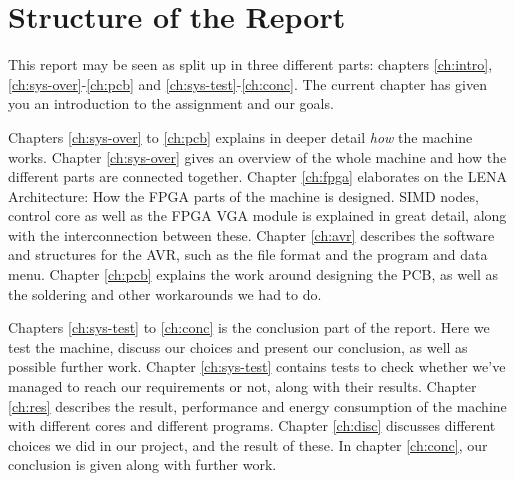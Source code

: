 \section{Structure of the Report}

This report may be seen as split up in three different parts: chapters
\ref{ch:intro}, \ref{ch:sys-over}-\ref{ch:pcb} and
\ref{ch:sys-test}-\ref{ch:conc}.  The
current chapter has given you an introduction to the assignment and our goals.

Chapters \ref{ch:sys-over} to \ref{ch:pcb} explains in deeper detail {\em how}
the machine works. Chapter \ref{ch:sys-over} gives an overview of the whole
machine and how the different parts are connected together. Chapter
\ref{ch:fpga} elaborates on the \ac{LENA} Architecture: How the \ac{FPGA} parts
of the machine is designed. \ac{SIMD} nodes, control core as well as the
\ac{FPGA} \ac{VGA} module is explained in great detail, along with the
interconnection between these. Chapter \ref{ch:avr} describes the software and
structures for the AVR, such as the file format and the program and data
menu. Chapter \ref{ch:pcb} explains the work around designing the \ac{PCB}, as
well as the soldering and other workarounds we had to do.

Chapters \ref{ch:sys-test} to \ref{ch:conc} is the conclusion part of the
report. Here we test the machine, discuss our choices and present our
conclusion, as well as possible further work. Chapter \ref{ch:sys-test} contains
tests to check whether we've managed to reach our requirements or not, along
with their results. Chapter \ref{ch:res} describes the result, performance and
energy consumption of the machine with different cores and different
programs. Chapter \ref{ch:disc} discusses different choices we did in our
project, and the result of these. In chapter \ref{ch:conc}, our conclusion is
given along with further work.
